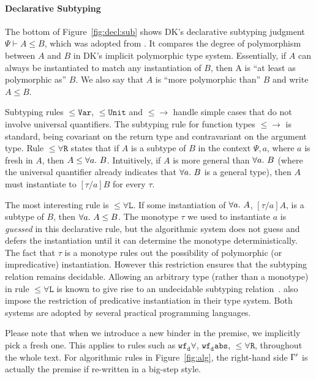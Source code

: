 
\paragraph{Declarative Subtyping}
The bottom of Figure~\ref{fig:decl:sub} shows DK's declarative subtyping judgment $\Psi \vdash A \le B$,
which was adopted from \citet{odersky1996putting}. It compares the
degree of polymorphism between $A$ and $B$ in DK's implicit polymorphic type system. 
Essentially, if $A$ can always be instantiated to match any instantiation of $B$,
then A is ``at least as polymorphic as'' $B$. We also 
say that $A$ is ``more polymorphic than'' $B$ and write $A \le B$.

Subtyping rules $\mathtt{{\le}Var}$, $\mathtt{{\le}Unit}$ and $\mathtt{{\le}{\to}}$
handle simple cases that do not involve universal quantifiers.
The subtyping rule for function types $\mathtt{{\le}{\to}}$ is standard,
being covariant on the return type and contravariant on the argument type.
Rule $\mathtt{{\le}\forall R}$ states that if $A$ is a subtype of $B$
in the context $\Psi, a$, where $a$ is fresh in $A$, then $A\le\all B$.
Intuitively, if $A$ is more general than $\all B$ (where the universal quantifier
already indicates that $\all B$ is a general type),
then $A$ must instantiate to $[\tau/a]B$ for every $\tau$.

The most interesting rule is $\mathtt{{\le}\forall L}$.
If some instantiation of $\all A$, $[\tau/a]A$, is a subtype of $B$,
then $\all A \le B$.
The monotype $\tau$ we used to instantiate $a$ is \emph{guessed} in this
declarative rule, but the algorithmic system does not guess and defers the
instantiation until it can determine the monotype deterministically.
The fact that $\tau$ is a monotype rules out the possibility of
polymorphic (or impredicative) instantiation.
However this restriction ensures that the subtyping relation remains
decidable. Allowing an arbitrary type (rather than a monotype) in rule $\mathtt{{\le}\forall L}$
is known to give rise to an undecidable subtyping relation~\cite{tiuryn1996subtyping}.
\citet{jones2007practical} also impose the restriction of
predicative instantiation in their type system.
Both systems are adopted by several practical programming languages.

Please note that when we introduce a new binder in the premise, we implicitly pick a fresh one.
This applies to rules such as $\mathtt{wf_d\forall}$, $\mathtt{wf_dabs}$, $\mathtt{{\le}\forall R}$,
throughout the whole text.
For algorithmic rules in Figure~\ref{fig:alg}, the right-hand side $\Gamma'$
is actually the premise if re-written in a big-step style.


